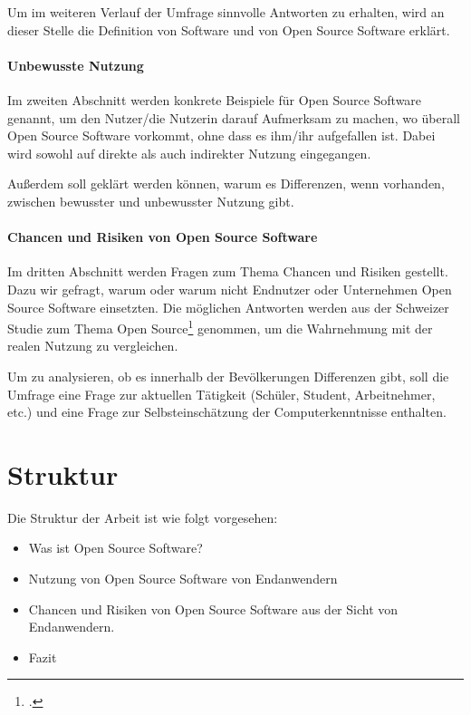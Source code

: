 \documentclass[a4paper]{article}
\begin{document}
	       Um im weiteren Verlauf der Umfrage sinnvolle Antworten zu erhalten, wird an dieser Stelle die Definition von Software und von Open Source Software erklärt.
	 
	   
	   \paragraph{Unbewusste Nutzung}
	       Im zweiten Abschnitt werden konkrete Beispiele für Open Source Software genannt, um den Nutzer/die Nutzerin  darauf Aufmerksam zu machen, wo überall Open Source Software vorkommt, ohne dass es ihm/ihr aufgefallen ist. Dabei wird sowohl auf direkte als auch indirekter Nutzung eingegangen.
	       
	       Außerdem soll geklärt werden können, warum es Differenzen, wenn vorhanden, zwischen bewusster und unbewusster Nutzung gibt.
	       
	   \paragraph{Chancen und Risiken von Open Source Software}
	       Im dritten Abschnitt werden Fragen zum Thema Chancen und Risiken gestellt. Dazu wir gefragt, warum oder warum nicht Endnutzer oder Unternehmen Open Source Software einsetzten. Die möglichen Antworten werden aus der Schweizer Studie zum Thema Open Source\footcite{oss:studie} genommen, um die Wahrnehmung mit der realen Nutzung zu vergleichen.
	   \\\par
	   Um zu analysieren, ob es innerhalb der Bevölkerungen Differenzen gibt, soll die Umfrage eine Frage zur aktuellen Tätigkeit (Schüler, Student, Arbeitnehmer, etc.) und eine Frage zur Selbsteinschätzung der Computerkenntnisse enthalten.
	   
	   
	\section{Struktur}
	   Die Struktur der Arbeit ist wie folgt vorgesehen:
	
	   \begin{itemize}
	       \item Was ist Open Source Software?
	       \item Nutzung von Open Source Software von Endanwendern
	       \item Chancen und Risiken von Open Source Software aus der Sicht von Endanwendern.
	       \item Fazit
	   \end{itemize}
	   
\end{document}
